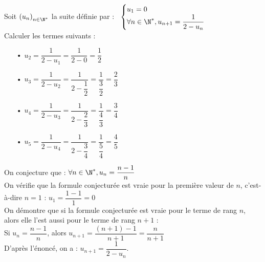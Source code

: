Soit $\left(u_n\right)_{n \in \N^*}$ la suite définie par :$ \; \; \; \begin{cases}
u_1 = 0 \\
\forall n \in \N^*, u_{n+1} = \dfrac{1}{2 - u_n} \\
\end{cases}$ \\

Calculer les termes suivants : \\

\begin{itemize}
\item[•] $u_2 = \dfrac{1}{2 - u_1} = \dfrac{1}{2 - 0} = \dfrac{1}{2}$ \vspace*{.3cm} \\
\item[•] $ u_3 = \dfrac{1}{2 - u_2} = \dfrac{1}{2 - \dfrac{1}{2}} = \dfrac{1}{\dfrac{3}{2}} = \dfrac{2}{3}$ \vspace*{.3cm} \\
\item[•] $u_4 = \dfrac{1}{2 - u_3} = \dfrac{1}{2 - \dfrac{2}{3}} = \dfrac{1}{\dfrac{4}{3}} = \dfrac{3}{4}$ \vspace*{.3cm} \\
\item[•] $u_5 = \dfrac{1}{2 - u_4} = \dfrac{1}{2 - \dfrac{3}{4}} = \dfrac{1}{\dfrac{5}{4}} = \dfrac{4}{5}$ \vspace*{.3cm} \\
\end{itemize}

\vspace*{.3cm}

On conjecture que : $\forall n \in \N^*, u_n = \dfrac{n - 1}{n}$ \\

On vérifie que la formule conjecturée est vraie pour la première valeur de $n$, c'est-à-dire $n = 1$ : $u_1 = \dfrac{1 - 1}{1} = 0$ \\

On démontre que si la formule conjecturée est vraie pour le terme de rang $n$, alors elle l'est aussi pour le terme de rang $n + 1$ : \\

Si $u_n = \dfrac{n-1}{n}$, alors $ u_{n+1} = \dfrac{\left(n+1\right) - 1}{n + 1} = \dfrac{n}{n+1}$ \\

D'après l'énoncé, on a : $u_{n+1} = \dfrac{1}{2 - u_n}$. \\


